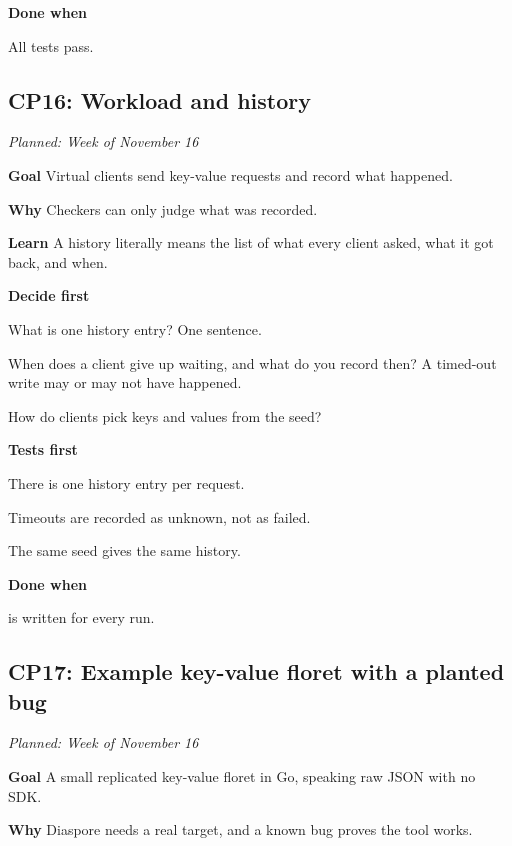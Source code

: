\documentclass[11pt,letterpaper]{article}
\newcommand{\code}[1]{\texttt{\detokenize{#1}}}
\newcommand{\lbl}[1]{\textbf{#1}\enspace}
\newcommand{\when}[1]{\par\textit{Planned: #1}\par}
\begin{document}
\lbl{Done when}
\begin{checks}
  \item All tests pass.
\end{checks}

\subsection{CP16: Workload and history}
\when{Week of November 16}

\lbl{Goal} Virtual clients send key-value requests and record what happened.

\lbl{Why} Checkers can only judge what was recorded.

\lbl{Learn} A history literally means the list of what every client asked, what it got back, and when.

\lbl{Decide first}
\begin{asks}
  \item What is one history entry? One sentence.
  \item When does a client give up waiting, and what do you record then? A timed-out write may or may not have happened.
  \item How do clients pick keys and values from the seed?
\end{asks}

\lbl{Tests first}
\begin{checks}
  \item There is one history entry per request.
  \item Timeouts are recorded as unknown, not as failed.
  \item The same seed gives the same history.
\end{checks}

\lbl{Done when}
\begin{checks}
  \item \code{history.jsonl} is written for every run.
\end{checks}

\subsection{CP17: Example key-value floret with a planted bug}
\when{Week of November 16}

\lbl{Goal} A small replicated key-value floret in Go, speaking raw JSON with no SDK.

\lbl{Why} Diaspore needs a real target, and a known bug proves the tool works.
\end{document}
